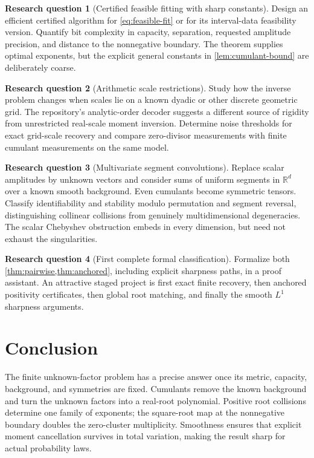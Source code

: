 \documentclass[11pt,a4paper]{article}
\numberwithin{equation}{section}
\theoremstyle{definition}
\newtheorem{problem}[problem]{Research question}
\theoremstyle{remark}
\newcommand{\R}{\mathbb R}
\begin{document}
\begin{problem}[Certified feasible fitting with sharp constants]
Design an efficient certified algorithm for \eqref{eq:feasible-fit} or for
its interval-data feasibility version.  Quantify bit complexity in capacity,
separation, requested amplitude precision, and distance to the nonnegative
boundary.  The theorem supplies optimal exponents, but the explicit general
constants in \cref{lem:cumulant-bound} are deliberately coarse.
\end{problem}

\begin{problem}[Arithmetic scale restrictions]
Study how the inverse problem changes when scales lie on a known dyadic or
other discrete geometric grid.  The repository's analytic-order decoder
suggests a different source of rigidity from unrestricted real-scale moment
inversion.  Determine noise thresholds for exact grid-scale recovery and compare
zero-divisor measurements with finite cumulant measurements on the same model.
\end{problem}

\begin{problem}[Multivariate segment convolutions]
Replace scalar amplitudes by unknown vectors and consider sums of uniform
segments in $\R^d$ over a known smooth background.  Even cumulants become
symmetric tensors.  Classify identifiability and stability modulo permutation
and segment reversal, distinguishing collinear collisions from genuinely
multidimensional degeneracies.  The scalar Chebyshev obstruction embeds in every
dimension, but need not exhaust the singularities.
\end{problem}

\begin{problem}[First complete formal classification]
Formalize both \cref{thm:pairwise,thm:anchored}, including explicit sharpness
paths, in a proof assistant.  An attractive staged project is first exact
finite recovery, then anchored positivity certificates, then global root
matching, and finally the smooth $L^1$ sharpness arguments.
\end{problem}

\section{Conclusion}
The finite unknown-factor problem has a precise answer once its metric,
capacity, background, and symmetries are fixed.  Cumulants remove the known
background and turn the unknown factors into a real-root polynomial.  Positive
root collisions determine one family of exponents; the square-root map at the
nonnegative boundary doubles the zero-cluster multiplicity.  Smoothness ensures
that explicit moment cancellation survives in total variation, making the
result sharp for actual probability laws.
\end{document}
